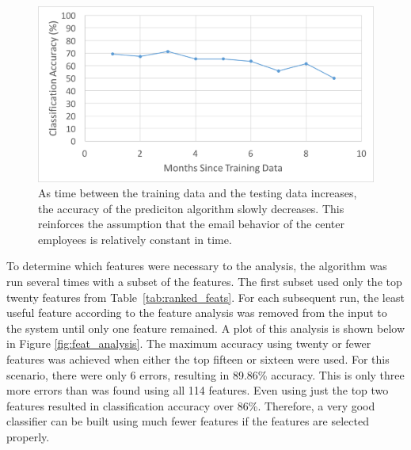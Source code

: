 \documentclass[12pt]{report}
\begin{document}
\begin{figure}[t]
    \centering
        \includegraphics[width=.8\columnwidth,trim={1mm 6mm 1mm 3.5mm},clip]{TimeGapsAnalysis}
        \vspace{-7pt}
        \caption[Accuracy of classification over time]{As time between the training data and the testing data increases, the accuracy of the prediciton algorithm slowly decreases.  This reinforces the assumption that the email behavior of the center employees is relatively constant in time.}
        \label{fig:time_analysis}
\end{figure}

To determine which features were necessary to the analysis, the algorithm was run several times with a subset of the features.
The first subset used only the top twenty features from Table~\ref{tab:ranked_feats}.
For each subsequent run, the least useful feature according to the feature analysis was removed from the input to the system until only one feature remained.
A plot of this analysis is shown below in Figure \ref{fig:feat_analysis}.
The maximum accuracy using twenty or fewer features was achieved when either the top fifteen or sixteen were used.
For this scenario, there were only 6 errors, resulting in 89.86\% accuracy.
This is only three more errors than was found using all 114 features.
Even using just the top two features resulted in classification accuracy over 86\%.
Therefore, a very good classifier can be built using much fewer features if the features are selected properly.
\end{document}
